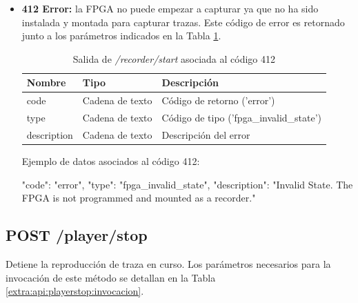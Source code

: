 \begin{itemize}
{\begin{minipage}{\textwidth}
Ejemplo de datos asociados al código 400:

\begin{code}[language=json]
{
  "code": "error",
  "type": "notification",
  "description": "Invalid capture name (must not exist)."
}
\end{code}
\end{minipage}
}

\item{\textbf{412 Error:} la \gls{FPGA} no puede empezar a capturar ya que no ha sido instalada y montada para capturar \glspl{traza}. Este código de error es retornado junto a los parámetros indicados en la Tabla \ref{extra:api:recorderstart:error412}.
\begin{table}[H]
\centering
\begin{tabular}{|l|l|l|}
\hline
\rowcolor[HTML]{F5F5F5}
\textbf{Nombre}  & \textbf{Tipo}   & \textbf{Descripción}                    \\ \hline
code             & Cadena de texto & Código de retorno ('error')             \\ \hline
type             & Cadena de texto & Código de tipo ('fpga\_invalid\_state') \\ \hline
description      & Cadena de texto & Descripción del error                   \\ \hline
\end{tabular}
\caption{Salida de \textit{/recorder/start} asociada al código 412}
\label{extra:api:recorderstart:error412}
\end{table}

\begin{minipage}{\textwidth}
Ejemplo de datos asociados al código 412:

\begin{code}[language=json]
{
  "code": "error",
  "type": "fpga_invalid_state",
  "description": "Invalid State. The FPGA is not programmed and mounted as a recorder."
}
\end{code}
\end{minipage}
}

\end{itemize}

%
%
\subsection{POST /player/stop}
Detiene la reproducción de \gls{traza} en curso. Los parámetros necesarios para la invocación de este método se detallan en la Tabla \ref{extra:api:playerstop:invocacion}.

